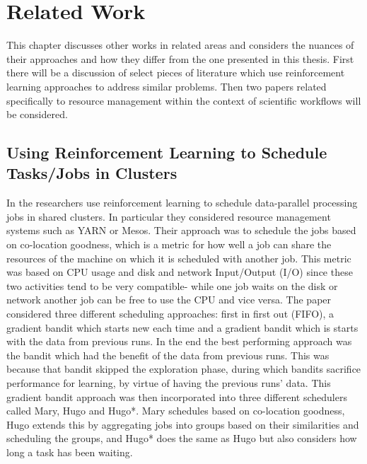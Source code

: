 
\cleardoublepage
\chapter{Related Work}
\label{cha:related_work}

This chapter discusses other works in related areas and considers the nuances of their approaches and how they differ from the one presented in this thesis. First there will be a discussion of select pieces of literature which use reinforcement learning approaches to address similar problems. Then two papers related specifically to resource management within the context of scientific workflows will be considered.

\section{Using Reinforcement Learning to Schedule Tasks/Jobs in Clusters}
\label{sec:rl_scheduling}

In \cite{learningToSchedule} the researchers use reinforcement learning to schedule data-parallel processing jobs in shared clusters. In particular they considered resource management systems such as YARN or Mesos. Their approach was to schedule the jobs based on co-location goodness, which is a metric for how well a job can share the resources of the machine on which it is scheduled with another job. This metric was based on CPU usage and disk and network Input/Output (I/O) since these two activities tend to be very compatible- while one job waits on the disk or network another job can be free to use the CPU and vice versa. The paper considered three different scheduling approaches: first in first out (FIFO), a gradient bandit which starts new each time and a gradient bandit which is starts with the data from previous runs. In the end the best performing approach was the bandit which had the benefit of the data from previous runs. This was because that bandit skipped the exploration phase, during which bandits sacrifice performance for learning, by virtue of having the previous runs' data. This gradient bandit approach was then incorporated into three different schedulers called Mary, Hugo and Hugo*.  Mary schedules based on co-location goodness, Hugo extends this by aggregating jobs into groups based on their similarities and scheduling the groups, and Hugo* does the same as Hugo but also considers how long a task has been waiting. 

